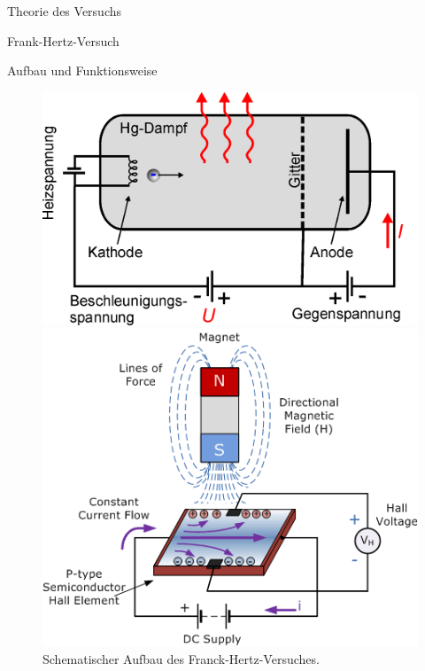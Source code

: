 \documentclass[pdftex, a4paper,11pt, twoside, ngerman]{report}
\begin{document}
\begin{chapter}{Theorie des Versuchs}
\begin{section}{Frank-Hertz-Versuch}
      \begin{subsection}{Aufbau und Funktionsweise}
        \begin{figure}[b!]
          \centering
          \begin{minipage}{0.48\textwidth}
            \centering
            \includegraphics[width=\textwidth]{Figures/hertz.png}
            \caption{Schematischer Aufbau des Franck-Hertz-Versuches.
                \cite{bib:FH}}
            \label{fig:FHaufbau}
          \end{minipage}\quad
          \begin{minipage}{0.48\textwidth}
            \centering
            \includegraphics[width=\textwidth]{Figures/hall-sensor.png}

\end{minipage}
\end{figure}
\end{subsection}
\end{section}
\end{chapter}
\end{document}
